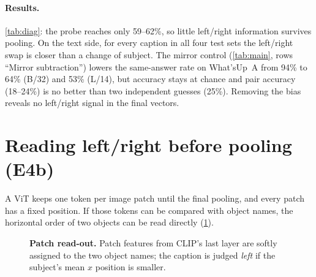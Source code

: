 \documentclass[10pt,twocolumn,letterpaper]{article}
\begin{document}
\paragraph{Results.}
\cref{tab:diag}: the probe reaches only 59--62\%, so little left/right information survives pooling.
On the text side, for every caption in all four test sets the left/right swap is closer than a change of subject.
The mirror control (\cref{tab:main}, rows ``Mirror subtraction'') lowers the same-answer rate on What'sUp~A from 94\% to 64\% (B/32) and 53\% (L/14), but accuracy stays at chance and pair accuracy (18--24\%) is no better than two independent guesses (25\%).
Removing the bias reveals no left/right signal in the final vectors.

\section{Reading left/right before pooling (E4b)}
\label{sec:readout}

A ViT keeps one token per image patch until the final pooling, and every patch has a fixed position.
If those tokens can be compared with object names, the horizontal order of two objects can be read directly (\cref{fig:method}).

\begin{figure}[t]
\centering
{}
\caption{\textbf{Patch read-out.} Patch features from CLIP's last layer are softly assigned to the two object names; the caption is judged \emph{left} if the subject's mean $x$ position is smaller.}
\label{fig:method}
\end{figure}
\end{document}
